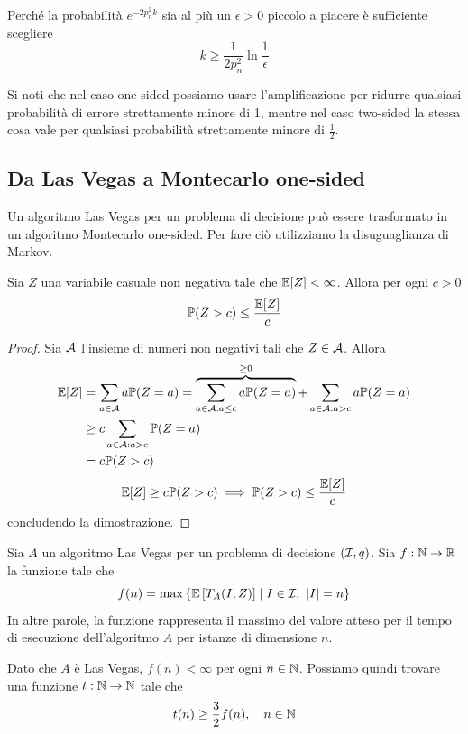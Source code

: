 Perché la probabilità $e^{-2p_n^2k}$ sia al più un $\epsilon > 0$ piccolo a piacere è sufficiente scegliere
$$k \geq \frac{1}{2p^2_n} \ln \frac{1}{\epsilon}$$

Si noti che nel caso one-sided possiamo usare l'amplificazione per ridurre qualsiasi probabilità di errore strettamente minore di 1, mentre nel caso two-sided la stessa cosa vale per qualsiasi probabilità strettamente minore di $\frac{1}{2}$.

\subsection{Da Las Vegas a Montecarlo one-sided}

Un algoritmo Las Vegas per un problema di decisione può essere trasformato in un algoritmo Montecarlo one-sided. Per fare ciò utilizziamo la disuguaglianza di Markov. \\

\begin{lemma}[Markov]
    \label{lemma:markov}
    Sia $Z$ una variabile casuale non negativa tale che $\mathbb{E} [Z] < \infty$. Allora per ogni $c > 0$
    $$ \mathbb{P} (Z > c) \leq \frac{\mathbb{E} [Z]}{c} $$
\end{lemma}
\begin{proof}
    Sia $\mathcal{A}$ l'insieme di numeri non negativi tali che $Z \in \mathcal{A}$. Allora
    \begin{align*}
        \mathbb{E}[Z] & = \sum_{a \in \mathcal{A}} a \mathbb{P} (Z = a) = \overbrace{\sum_{a \in \mathcal{A}: a \leq c} a \mathbb{P}(Z = a)}^{\geq 0} + \sum_{a \in \mathcal{A}: a > c} a \mathbb{P} (Z = a) \\
        & \geq c \sum_{a \in \mathcal{A}: a > c} \mathbb{P} (Z = a) \\
        & = c \mathbb{P} (Z > c)
    \end{align*}
    $$ \mathbb{E} [Z] \geq c \mathbb{P} (Z > c) \implies \mathbb{P} (Z > c) \leq \frac{\mathbb{E}[Z]}{c} $$
    concludendo la dimostrazione.
\end{proof}

Sia $A$ un algoritmo Las Vegas per un problema di decisione $(\mathcal{I}, q)$. Sia $f: \mathbb{N} \rightarrow \mathbb{R}$ la funzione tale che
$$ f(n) = \max \left\{\mathbb{E} \left[T_A (I,Z)\right] \mid I \in \mathcal{I}, \ |I| = n\right\}$$
In altre parole, la funzione rappresenta il massimo del valore atteso per il tempo di esecuzione dell'algoritmo $A$ per istanze di dimensione $n$.

Dato che $A$ è Las Vegas, $f(n) < \infty$ per ogni $n \in \mathbb{N}$. Possiamo quindi trovare una funzione $t: \mathbb{N} \rightarrow \mathbb{N}$ tale che
$$ t(n) \geq \frac{3}{2} f(n), \quad n \in \mathbb{N} $$

